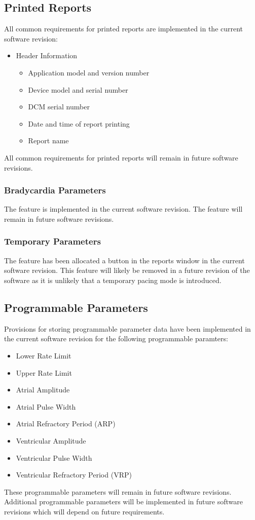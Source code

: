 \documentclass[12pt]{article}
\begin{document}
\subsection{Printed Reports}
All common requirements for printed reports are implemented in the current software revision:
\begin{itemize}
    \item Header Information
    \begin{itemize}
        \item Application model and version number
        \item Device model and serial number
        \item DCM serial number
        \item Date and time of report printing
        \item Report name 
    \end{itemize}
\end{itemize}
All common requirements for printed reports will remain in future software revisions.
\subsubsection{Bradycardia Parameters}
The feature is implemented in the current software revision. The feature will remain in future software revisions.
\subsubsection{Temporary Parameters}
The feature has been allocated a button in the reports window in the current software revision. This feature will likely be removed in a future revision of the software as it is unlikely that a temporary pacing mode is introduced.

\subsection{Programmable Parameters}
Provisions for storing programmable parameter data have been implemented in the current software revision for the following programmable paramters:
\begin{itemize}
    \item Lower Rate Limit
    \item Upper Rate Limit
    \item Atrial Amplitude
    \item Atrial Pulse Width
    \item Atrial Refractory Period (ARP)
    \item Ventricular Amplitude
    \item Ventricular Pulse Width
    \item Ventricular Refractory Period (VRP)
\end{itemize}
These programmable parameters will remain in future software revisions. Additional programmable parameters will be implemented in future software revisions which will depend on future requirements. 
\end{document}
